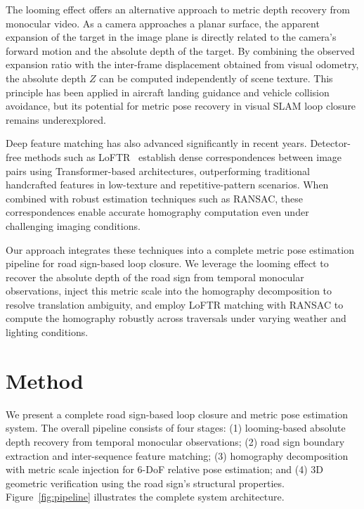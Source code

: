 \documentclass[runningheads]{llncs}
\begin{document}
The looming effect offers an alternative approach to metric depth recovery from
monocular video. As a camera approaches a planar surface, the apparent expansion
of the target in the image plane is directly related to the camera's forward motion
and the absolute depth of the target. By combining the observed expansion ratio
with the inter-frame displacement obtained from visual odometry, the absolute
depth $Z$ can be computed independently of scene texture. This principle has been
applied in aircraft landing guidance and vehicle collision avoidance, but its potential
for metric pose recovery in visual SLAM loop closure remains underexplored.

Deep feature matching has also advanced significantly in recent years. Detector-free
methods such as LoFTR~\cite{opencv_checkerboard} establish dense correspondences
between image pairs using Transformer-based architectures, outperforming traditional
handcrafted features in low-texture and repetitive-pattern scenarios. When combined
with robust estimation techniques such as RANSAC, these correspondences enable
accurate homography computation even under challenging imaging conditions.

Our approach integrates these techniques into a complete metric pose estimation
pipeline for road sign-based loop closure. We leverage the looming effect to recover
the absolute depth of the road sign from temporal monocular observations, inject
this metric scale into the homography decomposition to resolve translation ambiguity,
and employ LoFTR matching with RANSAC to compute the homography robustly
across traversals under varying weather and lighting conditions.



\section{Method}

We present a complete road sign-based loop closure and metric pose estimation system.
The overall pipeline consists of four stages: (1) looming-based absolute depth recovery
from temporal monocular observations; (2) road sign boundary extraction and inter-sequence
feature matching; (3) homography decomposition with metric scale injection for 6-DoF
relative pose estimation; and (4) 3D geometric verification using the road sign's structural
properties. Figure~\ref{fig:pipeline} illustrates the complete system architecture.
\end{document}
